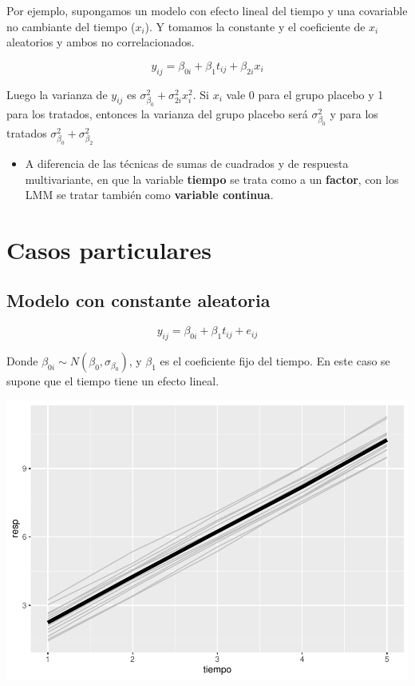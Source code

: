 \documentclass[
]{book}
\providecommand{\tightlist}{%
  \setlength{\itemsep}{0pt}\setlength{\parskip}{0pt}}
\begin{document}
Por ejemplo, supongamos un modelo con efecto lineal del tiempo y una covariable no cambiante del tiempo (\(x_i\)). Y tomamos la constante y el coeficiente de \(x_i\) aleatorios y ambos no correlacionados.

\[y_{ij} = \beta_{0i} + \beta_1 t_{ij} + \beta_{2i} x_i\]

Luego la varianza de \(y_{ij}\) es \(\sigma_{\beta_{0}}^2 + \sigma_{2i}^2 x_i^2\). Si \(x_i\) vale 0 para el grupo placebo y 1 para los tratados, entonces la varianza del grupo placebo será \(\sigma_{\beta_{0}}^2\) y para los tratados \(\sigma_{\beta_{0}}^2 + \sigma_{\beta_{2}}^2\)

\begin{itemize}
\tightlist
\item
  A diferencia de las técnicas de sumas de cuadrados y de respuesta multivariante, en que la variable \textbf{tiempo} se trata como a un \textbf{factor}, con los LMM se tratar también como \textbf{variable continua}.
\end{itemize}

\hypertarget{casos-particulares}{%
\section{Casos particulares}\label{casos-particulares}}

\hypertarget{modelo-con-constante-aleatoria}{%
\subsection{Modelo con constante aleatoria}\label{modelo-con-constante-aleatoria}}

\[y_{ij} = \beta_{0i} + \beta_{1} t_{ij} + e_{ij}\]

Donde \(\beta_{0i} \sim N(\beta_0, \sigma_{\beta_0})\), y \(\beta_1\) es el coeficiente fijo del tiempo. En este caso se supone que el tiempo tiene un efecto lineal.

\includegraphics{fig_out/unnamed-chunk-69-1.pdf}
\end{document}
